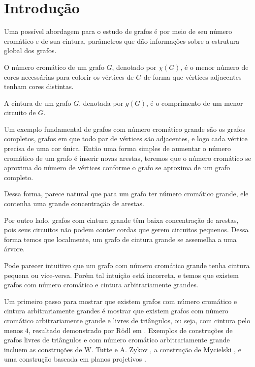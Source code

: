 \chapter{Introdução}
\label{cap:introducao}

Uma possível abordagem para o estudo de grafos é por meio de seu número cromático e de sua cintura, parâmetros que dão informações sobre a estrutura global dos grafos.

\begin{definicao}
O número cromático de um grafo $G$, denotado por $\chi(G)$, é o menor número de cores necessárias para colorir os vértices de $G$ de forma que vértices adjacentes tenham cores distintas.
\end{definicao}

\begin{definicao}
A cintura de um grafo $G$, denotada por $g(G)$, é o comprimento de um menor circuito de $G$.
\end{definicao}

Um exemplo fundamental de grafos com número cromático grande são os grafos completos, grafos em que todo par de vértices são adjacentes, e logo cada vértice precisa de uma cor única. Então uma forma simples de aumentar o número cromático de um grafo é inserir novas arestas, teremos que o número cromático se aproxima do número de vértices conforme o grafo se aproxima de um grafo completo.

Dessa forma, parece natural que para um grafo ter número cromático grande, ele contenha uma grande concentração de arestas.

Por outro lado, grafos com cintura grande têm baixa concentração de arestas, pois seus circuitos não podem conter cordas que gerem circuitos pequenos. Dessa forma temos que localmente, um grafo de cintura grande se assemelha a uma árvore.

Pode parecer intuitivo que um grafo com número cromático grande tenha cintura pequena ou vice-versa. Porém tal intuição está incorreta, e temos que existem grafos com número cromático e cintura arbitrariamente grandes.

Um primeiro passo para mostrar que existem grafos com número cromático e cintura arbitrariamente grandes é mostrar que existem grafos com número cromático arbitrariamente grande e livres de triângulos, ou seja, com cintura pelo menos $4$, resultado demonstrado por R\"{o}dl em \cite{rodl1977chromatic}. Exemplos de construções de grafos livres de triângulos e com número cromático arbitrariamente grande incluem as construções de W. Tutte \cite{descartes1947three} e A. Zykov \cite{zykov1949some}, a construção de Mycielski \cite{mycielski1955coloriage}, e uma construção baseada em planos projetivos \cite{codenotti2000some}.

